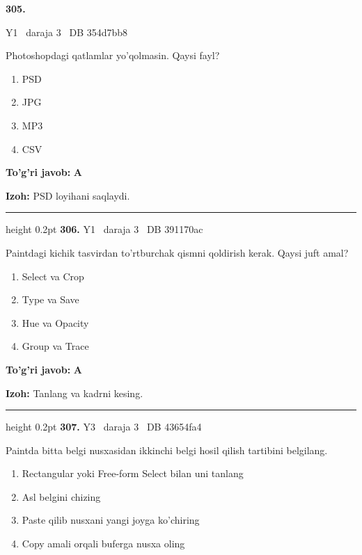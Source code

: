 \documentclass[10pt,a4paper,oneside]{article}
\begin{document}
\hypertarget{q305}{\textbf{\color{ink}305.}}  {\color{muted}\scriptsize Y1 \textbullet\ daraja 3 \textbullet\ DB 354d7bb8}
\par
Photoshopdagi qatlamlar yo'qolmasin. Qaysi fayl?
\begin{enumerate}[label=\Alph*),leftmargin=9mm]
\item PSD
\item JPG
\item MP3
\item CSV
\end{enumerate}
\begin{tcolorbox}[enhanced,breakable,colback=teal!4,colframe=teal!45!black,boxrule=0.45pt,arc=1.2mm,left=2.8mm,right=2.8mm,top=2mm,bottom=2mm,before skip=2mm,after skip=2mm]
\textbf{\color{teal}To'g'ri javob:} \textbf{A}
\par\smallskip
\textbf{Izoh:} PSD loyihani saqlaydi.
\end{tcolorbox}
\vspace{2mm}\hrule height 0.2pt \vspace{4mm}
\hypertarget{q306}{\textbf{\color{ink}306.}}  {\color{muted}\scriptsize Y1 \textbullet\ daraja 3 \textbullet\ DB 391170ac}
\par
Paintdagi kichik tasvirdan to'rtburchak qismni qoldirish kerak. Qaysi juft amal?
\begin{enumerate}[label=\Alph*),leftmargin=9mm]
\item Select va Crop
\item Type va Save
\item Hue va Opacity
\item Group va Trace
\end{enumerate}
\begin{tcolorbox}[enhanced,breakable,colback=teal!4,colframe=teal!45!black,boxrule=0.45pt,arc=1.2mm,left=2.8mm,right=2.8mm,top=2mm,bottom=2mm,before skip=2mm,after skip=2mm]
\textbf{\color{teal}To'g'ri javob:} \textbf{A}
\par\smallskip
\textbf{Izoh:} Tanlang va kadrni kesing.
\end{tcolorbox}
\vspace{2mm}\hrule height 0.2pt \vspace{4mm}
\hypertarget{q307}{\textbf{\color{ink}307.}}  {\color{muted}\scriptsize Y3 \textbullet\ daraja 3 \textbullet\ DB 43654fa4}
\par
Paintda bitta belgi nusxasidan ikkinchi belgi hosil qilish tartibini belgilang.
\begin{enumerate}[label=\Alph*),leftmargin=9mm]
\item Rectangular yoki Free-form Select bilan uni tanlang
\item Asl belgini chizing
\item Paste qilib nusxani yangi joyga ko'chiring
\item Copy amali orqali buferga nusxa oling
\end{enumerate}
\end{document}
